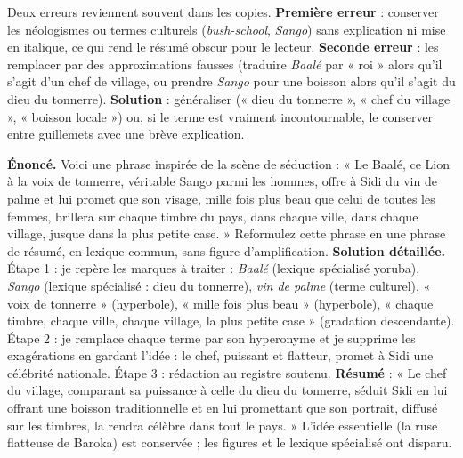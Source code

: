 \documentclass[11pt]{article}
\begin{document}
\begin{attention}
Deux erreurs reviennent souvent dans les copies. \textbf{Première erreur} : conserver les néologismes ou termes culturels (\emph{bush-school}, \emph{Sango}) sans explication ni mise en italique, ce qui rend le résumé obscur pour le lecteur. \textbf{Seconde erreur} : les remplacer par des approximations fausses (traduire \emph{Baalé} par « roi » alors qu'il s'agit d'un chef de village, ou prendre \emph{Sango} pour une boisson alors qu'il s'agit du dieu du tonnerre). \textbf{Solution} : généraliser (« dieu du tonnerre », « chef du village », « boisson locale ») ou, si le terme est vraiment incontournable, le conserver entre guillemets avec une brève explication.
\end{attention}

\begin{exoresolu}
\textbf{Énoncé.} Voici une phrase inspirée de la scène de séduction : « Le Baalé, ce Lion à la voix de tonnerre, véritable Sango parmi les hommes, offre à Sidi du vin de palme et lui promet que son visage, mille fois plus beau que celui de toutes les femmes, brillera sur chaque timbre du pays, dans chaque ville, dans chaque village, jusque dans la plus petite case. » Reformulez cette phrase en une phrase de résumé, en lexique commun, sans figure d'amplification.
\tcblower
\textbf{Solution détaillée.} Étape 1 : je repère les marques à traiter : \emph{Baalé} (lexique spécialisé yoruba), \emph{Sango} (lexique spécialisé : dieu du tonnerre), \emph{vin de palme} (terme culturel), « voix de tonnerre » (hyperbole), « mille fois plus beau » (hyperbole), « chaque timbre, chaque ville, chaque village, la plus petite case » (gradation descendante). Étape 2 : je remplace chaque terme par son hyperonyme et je supprime les exagérations en gardant l'idée : le chef, puissant et flatteur, promet à Sidi une célébrité nationale. Étape 3 : rédaction au registre soutenu. \textbf{Résumé} : « Le chef du village, comparant sa puissance à celle du dieu du tonnerre, séduit Sidi en lui offrant une boisson traditionnelle et en lui promettant que son portrait, diffusé sur les timbres, la rendra célèbre dans tout le pays. » L'idée essentielle (la ruse flatteuse de Baroka) est conservée ; les figures et le lexique spécialisé ont disparu.
\end{exoresolu}
\end{document}
